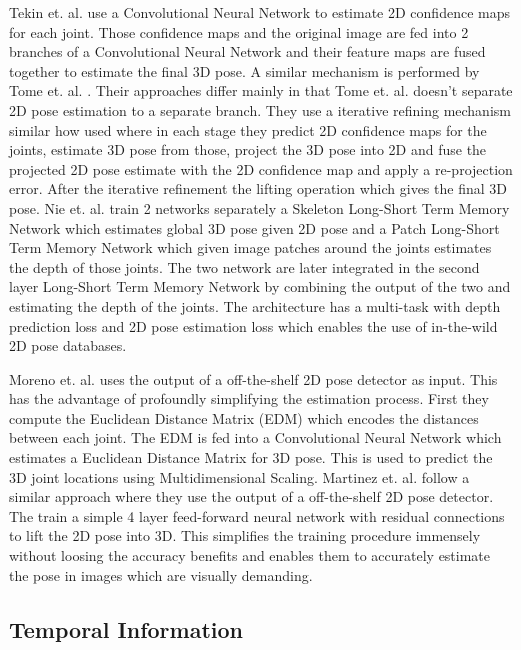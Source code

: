 Tekin et. al. \parencite{tekin2017learning} use a Convolutional Neural Network to estimate 2D confidence maps for each joint. Those confidence maps and the original image are fed into 2 branches of a Convolutional Neural Network and their feature maps are fused together to estimate the final 3D pose. A similar mechanism is performed by Tome et. al. \parencite{tome2017lifting}. Their approaches differ mainly in that Tome et. al. doesn't separate 2D pose estimation to a separate branch. They use a iterative refining mechanism similar how \parencite{newell2016stacked} used where in each stage they predict 2D confidence maps for the joints, estimate 3D pose from those, project the 3D pose into 2D and fuse the projected 2D pose estimate with the 2D confidence map and apply a re-projection error. After the iterative refinement the lifting operation which gives the final 3D pose. Nie et. al. \parencite{nie2017monocular} train 2 networks separately a Skeleton Long-Short Term Memory Network \parencite{hochreiter1997long} which estimates global 3D pose given 2D pose and a Patch Long-Short Term Memory Network which given image patches around the joints estimates the depth of those joints. The two network are later integrated in the second layer Long-Short Term Memory Network by combining the output of the two and estimating the depth of the joints. The architecture has a multi-task with depth prediction loss and 2D pose estimation loss which enables the use of in-the-wild 2D pose databases. 

Moreno et. al. \parencite{moreno20173d} uses the output of a off-the-shelf 2D pose detector as input. This has the advantage of profoundly simplifying the estimation process. First they compute the Euclidean Distance Matrix (EDM) which encodes the distances between each joint. The EDM is fed into a Convolutional Neural Network which estimates a Euclidean Distance Matrix for 3D pose. This is used to predict the 3D joint locations using Multidimensional Scaling. Martinez et. al. \parencite{martinez2017simple} follow a similar approach where they use the output of a off-the-shelf 2D pose detector. The train a simple 4 layer feed-forward neural network with residual connections to lift the 2D pose into 3D. This simplifies the training procedure immensely without loosing the accuracy benefits and enables them to accurately estimate the pose in images which are visually demanding.

\subsection{Temporal Information}

